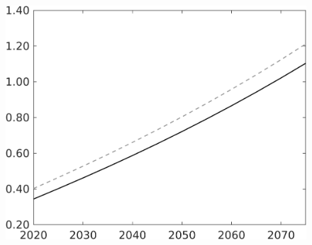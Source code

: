 \begin{figure}[h!!]
\begin{minipage}[]{0.32\textwidth}
	\end{minipage}		
	\begin{minipage}[]{0.32\textwidth}
		\includegraphics[width=1\textwidth]{../../codding_model/own_basedOnFried/optimalPol_010922_revision/figures/all_13Sept22/CompTaul_LFBAU_Reg0_C_spillover0_nsk0_xgr0_sep1_countec0_GovRev1_etaa0.79_lgd0.png}
	\end{minipage}	
\end{figure}

